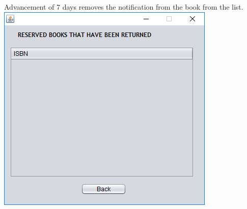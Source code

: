 \documentclass{article}
\begin{document}
\begin{enumerate}
\begin{itemize}
Advancement of 7 days removes the notification from the book from the list.\\
\includegraphics[scale=0.8]{images/UserLogin/Actions/Reserve_reserveNotif/Reservenotifcancelledafter7days.PNG}\\



\end{itemize}
\end{enumerate}
\end{document}
